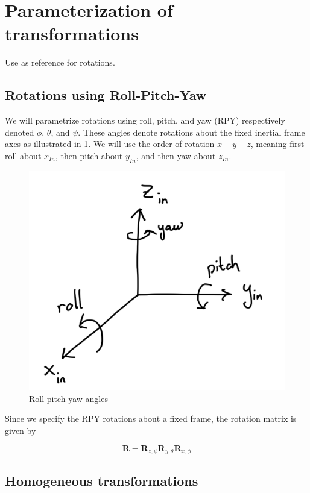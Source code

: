 \section{Parameterization of transformations}

Use \cite{spong} as reference for rotations.

\subsection{Rotations using Roll-Pitch-Yaw}

We will parametrize rotations using roll, pitch, and yaw (RPY) respectively denoted $\phi$, $\theta$, and $\psi$. These angles denote rotations about the fixed inertial frame axes as illustrated in \cref{fig:rpy-angles}. We will use the order of rotation $x-y-z$, meaning first roll about $x_{In}$, then pitch about $y_{In}$, and then yaw about $z_{In}$.



\begin{figure}
    \centering
    \includegraphics[width=\textwidth]{sections/figures/roll-pitch-yaw.jpeg}
    \caption{Roll-pitch-yaw angles}
    \label{fig:rpy-angles}
\end{figure}

Since we specify the RPY rotations about a fixed frame, the rotation matrix is given by

\begin{equation}
  \mathbf{R} = \mathbf{R}_{z,\psi}\mathbf{R}_{y,\theta}\mathbf{R}_{x,\phi}
\end{equation}



\subsection{Homogeneous transformations}
